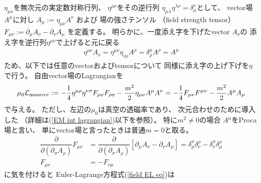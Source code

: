 $\eta_{\mu\nu}$を無次元の実定数対称行列、
$\eta^{\mu\nu}$をその逆行列
$\eta_{\mu\lambda} \eta^{\lambda \nu} = \delta_\mu^\nu$として、
vector場$A^\mu$に対し
$A_\mu := \eta_{\mu\nu} A^\nu$
および
場の強さテンソル
（field strength tensor）
$F_{\mu\nu} :=
\partial_\mu A_\nu
- \partial_\nu A_\mu$
を定義する。
明らかに、一度添え字を下げたvector $A_\nu$の
添え字を逆行列$\eta^{\mu\nu}$で上げると元に戻る
\begin{align}
    \eta^{\mu\nu} A_\nu
    =
    \eta^{\mu\nu} \eta_{\nu \rho} A^\rho
    =
    \delta^\mu_\rho A^\rho
    =
    A^\mu
\end{align}
ため、以下では任意のvectorおよびtensorについて
同様に添え字の上げ下げを$\eta$で行う。
自由vector場のLagrangianを
\begin{align}
    \mu_0 \mathcal{L}_{\rm massvec}
:=
    -
    \dfrac{1}{4}
        \eta^{\mu\rho}
        \eta^{\nu\sigma}
    F_{\mu\nu} F_{\rho\sigma}
    -
    \dfrac{m^2}{2}
        \eta_{\mu \nu}
        A^\mu A^\nu
=
    - \dfrac{1}{4}
    F_{\mu\nu} F^{\mu\nu}
    -
    \dfrac{m^2}{2}
		A^\mu A_\mu
\label{massive free vector lagrangian}
\end{align}
で与える。
ただし、左辺の$\mu_0$は真空の透磁率であり、
次元合わせのために導入した
（詳細は(\ref{EM int lagrangian})以下を参照）。
特に$m^2 \neq 0$の場合
$A^\mu$をProca場と言い、
単にvector場と言ったときは普通$m = 0$と取る。
\begin{align}
    \dfrac{\partial}
        {\partial (\partial_\sigma A_\rho)}
    F_{\mu\nu}
    &=
    \dfrac{\partial}
        {\partial (\partial_\sigma A_\rho)}
    \left[
        \partial_\mu A_\nu
        - \partial_\nu A_\mu
    \right]
    =
    \delta_\mu^\sigma
    \delta_\nu^\rho
    -
    \delta_\nu^\sigma
    \delta_\mu^\rho
\\
    F_{\mu\nu} &= - F_{\nu\mu}
\end{align}
に気を付けると
Euler-Lagrange方程式(\ref{field EL eq})は
